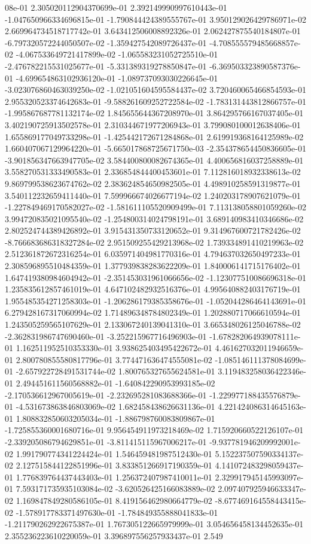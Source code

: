 08e-01	2.305020112904370699e-01	2.392149990997610443e-01	-1.047650966334696815e-01	-1.790844424389555767e-01	3.950129026429786971e-02	2.669964734518717742e-01	3.643412506008892326e-01	2.062427875540184807e-01	-6.797320572244050507e-02	-1.359427542089726437e-01	-4.708555579485668857e-02	-4.067533649721417899e-02	-1.065583231052725510e-01	-2.476782215531025677e-01	-5.331389319278850847e-01	-6.369503323890587376e-01	-4.699654863102936120e-01	-1.089737093030226645e-01	-3.023076860463039250e-02	-1.021051604595584437e-02	3.720460065466854593e-01	2.955320523374642683e-01	-9.588261609252722584e-02	-1.783131443812866757e-01	-1.995867687781132174e-02	1.845655644367208970e-01	3.864295766167037405e-01	3.402190725913502578e-01	2.310344671977206943e-01	3.799080100012638406e-01	1.655869177049733298e-01	-1.425442172671284868e-01	2.619919368164125989e-02	1.660407067129964220e-01	-5.665017868725671750e-03	-2.354378654450836605e-01	-3.901856347663947705e-02	3.584400800082674365e-01	4.400656816037258889e-01	3.558270531333490583e-01	2.336854844400453601e-01	7.112816018932338613e-02	9.869799538623674762e-02	2.383624854650982505e-01	4.498910258591319877e-01	3.540112232659411440e-01	7.599966674026677194e-02	1.240203178907621079e-01	-1.227849469170582027e-02	-1.581611105520909499e-01	7.113138058801059260e-02	3.994720835021095540e-02	-1.254800314024798191e-01	3.689140983410346686e-02	2.802524744389426892e-01	3.915431350733120652e-01	9.314967600721782426e-02	-8.766683686318327284e-02	2.951509255429213968e-02	1.739334891410219963e-02	2.512361872672316254e-01	6.035971404981770316e-01	4.794637032650497233e-01	2.308596895510484359e-01	1.377939838283622209e-01	1.840006141715176402e-01	1.647419380984604942e-01	-2.351453031961066656e-02	-1.123077510086696318e-01	1.235835612857461019e-01	4.647102482932516376e-01	4.995640882403176719e-01	1.955485354271258303e-01	-1.206286179385358676e-01	-1.052044286464143691e-01	6.279428167317060994e-02	1.714896348784802349e-01	1.202880717066610594e-01	1.243505259565107629e-01	2.133067240139041310e-01	3.665348026125046788e-02	-2.362831986747690460e-01	-3.252215967716496903e-01	-1.678282064939078111e-01	1.162511952510353330e-01	3.938625403495422672e-01	4.461627032011946659e-01	2.800780855580817796e-01	3.774471636474555081e-02	-1.085146111378084699e-01	-2.657922728491531744e-02	1.800765327655624581e-01	3.119483258036422346e-01	2.494451611560568882e-01	-1.640842290953993185e-02	-2.170536612967005619e-01	-2.232695281083688366e-01	-1.229977188435576879e-01	-4.531673863846803069e-02	1.682458438626631136e-01	4.221424086314645163e-01	1.808832850603205034e-01	-1.886798760083809867e-01	-1.725855360001680716e-01	9.956454911973218469e-02	1.715920660522126107e-01	-2.339205086794629851e-01	-3.811415115967006217e-01	-9.937781946209992001e-02	1.991790774341224424e-01	1.546459481987512430e-01	5.152237507590334137e-02	2.127515844122851996e-01	3.833851266917190359e-01	4.141072483298059437e-01	1.776839764437443403e-01	1.256372407987410011e-01	2.329917945145993097e-01	7.593171735935103084e-02	-3.620526425166083889e-02	2.097407925946633347e-02	1.169847849280586105e-01	8.419156462980664779e-02	-8.677469164558443415e-02	-1.578917783371497630e-01	-1.784849355888041833e-01	-1.211790262922675387e-01	1.767305122665979999e-01	3.054656458134452635e-01	2.355236223610220059e-01	3.396897556257933437e-01	2.549